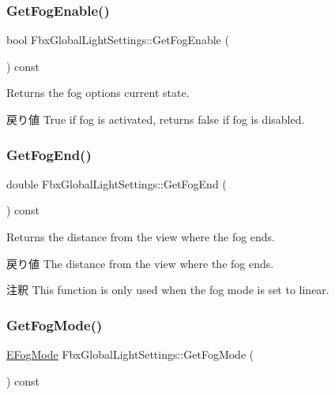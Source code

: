 \subsubsection{\texorpdfstring{Get\+Fog\+Enable()}{GetFogEnable()}}
{\footnotesize\ttfamily bool Fbx\+Global\+Light\+Settings\+::\+Get\+Fog\+Enable (\begin{DoxyParamCaption}{ }\end{DoxyParamCaption}) const}

Returns the fog option\textquotesingle{}s current state. \begin{DoxyReturn}{戻り値}
{\ttfamily True} if fog is activated, returns {\ttfamily false} if fog is disabled. 
\end{DoxyReturn}
\mbox{\label{class_fbx_global_light_settings_a04ed07f18330b888bd4439038e3dad2a}} 
\subsubsection{\texorpdfstring{Get\+Fog\+End()}{GetFogEnd()}}
{\footnotesize\ttfamily double Fbx\+Global\+Light\+Settings\+::\+Get\+Fog\+End (\begin{DoxyParamCaption}{ }\end{DoxyParamCaption}) const}

Returns the distance from the view where the fog ends. \begin{DoxyReturn}{戻り値}
The distance from the view where the fog ends. 
\end{DoxyReturn}
\begin{DoxyRemark}{注釈}
This function is only used when the fog mode is set to linear. 
\end{DoxyRemark}
\mbox{\label{class_fbx_global_light_settings_a29f90b9f3f5c1a9057cf226c80892df1}} 
\subsubsection{\texorpdfstring{Get\+Fog\+Mode()}{GetFogMode()}}
{\footnotesize\ttfamily \hyperlink{class_fbx_global_light_settings_a2d6040cb267cbdb092bdf9fb73de8d6d}{E\+Fog\+Mode} Fbx\+Global\+Light\+Settings\+::\+Get\+Fog\+Mode (\begin{DoxyParamCaption}{ }\end{DoxyParamCaption}) const}

